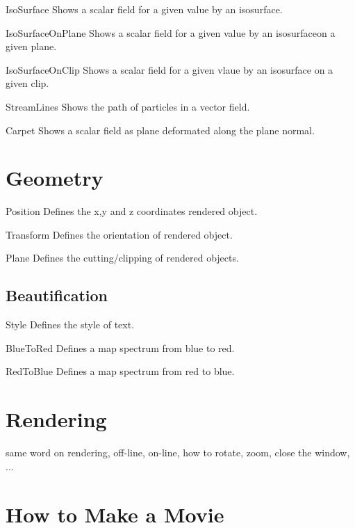 \begin{classdesc}{IsoSurface}{}
 Shows a scalar field for a given value by 
an isosurface.
\end{classdesc}

\begin{classdesc}{IsoSurfaceOnPlane}{}
 Shows a scalar field for a given value by 
an isosurfaceon a given plane.
\end{classdesc}

\begin{classdesc}{IsoSurfaceOnClip}{}
 Shows a scalar field for a given vlaue by 
an isosurface on a given clip.
\end{classdesc}

\begin{classdesc}{StreamLines}{}
 Shows the path of particles in a vector field.
\end{classdesc}

\begin{classdesc}{Carpet}{}
 Shows a scalar field as plane deformated along 
the plane normal.
\end{classdesc}

\section{Geometry}
\begin{classdesc}{Position}{}
 Defines the x,y and z coordinates rendered object.
\end{classdesc}

\begin{classdesc}{Transform}{}
Defines the orientation of rendered object.
\end{classdesc}

\begin{classdesc}{Plane}{}
Defines the cutting/clipping of rendered objects.
\end{classdesc}


\subsection{Beautification}
\begin{classdesc}{Style}{}
Defines the style of text.
\end{classdesc}

\begin{classdesc}{BlueToRed}{}
 Defines a map spectrum from blue to red.
\end{classdesc}

\begin{classdesc}{RedToBlue}{}
 Defines a map spectrum from red to blue.
\end{classdesc}

\section{Rendering}
same word on rendering, off-line, on-line, how to rotate, zoom, close the window, ...

\section{How to Make a Movie}
